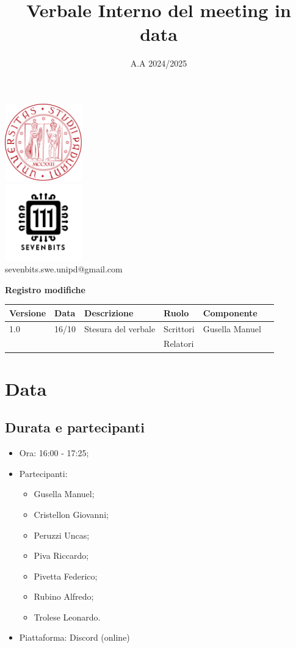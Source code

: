 \documentclass[12pt]{article}
\title{Verbale Interno del meeting in data}
\date{A.A 2024/2025}
\begin{document}
\maketitle
\center 
\includegraphics[width=0.25\textwidth]{LogoUnipd}\\
\includegraphics[width=0.25\textwidth]{Sevenbitslogo}\\
sevenbits.swe.unipd@gmail.com\\
\vspace{2mm}

\textbf{Registro modifiche}\\
\vspace{2mm}
\begin{tabular}{|l|l|l|l|l|l|}
\hline
\textbf{Versione} & \textbf{Data} & \textbf{Descrizione} & \textbf{Ruolo} & \textbf{Componente} \\
\hline
1.0 & 16/10 & Stesura del verbale & Scrittori & Gusella Manuel\\
\hline
& & & Relatori & \\
\hline
\end{tabular}

\raggedright
\tableofcontents
\newpage
\section{Data}
\subsection{Durata e partecipanti}
\begin{itemize}
\item Ora: 16:00 - 17:25;
\item Partecipanti: 	
	\begin{itemize}
	\item Gusella Manuel;
	\item Cristellon Giovanni;
	\item Peruzzi Uncas;
	\item Piva Riccardo;
	\item Pivetta Federico;
	\item Rubino Alfredo;
	\item Trolese Leonardo.
	\end{itemize}
\item Piattaforma: Discord (online)
\end{itemize}
\end{document}
